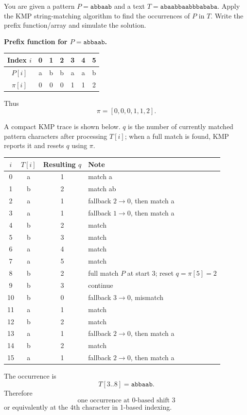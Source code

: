 \documentclass[11pt,a4paper]{article}
\begin{document}
\begin{qaquestion}
You are given a pattern \(P=\texttt{abbaab}\) and a text \(T=\texttt{abaabbaabbbababa}\). Apply the KMP string-matching algorithm to find the occurrences of \(P\) in \(T\). Write the prefix function/array and simulate the solution.
\end{qaquestion}
\begin{qaanswer}[Answer 4(b)]
\textbf{Prefix function for \(P=\texttt{abbaab}\).}

\begin{center}
\begin{tabular}{c|cccccc}
Index \(i\) &0&1&2&3&4&5\\\hline
\(P[i]\)&a&b&b&a&a&b\\
\(\pi[i]\)&0&0&0&1&1&2
\end{tabular}
\end{center}
Thus
\[
\boxed{\pi=[0,0,0,1,1,2]}.
\]

A compact KMP trace is shown below. \(q\) is the number of currently matched pattern characters after processing \(T[i]\); when a full match is found, KMP reports it and resets \(q\) using \(\pi\).

\begin{center}
\small
\begin{tabular}{c c c l}
\toprule
\(i\) & \(T[i]\) & Resulting \(q\) & Note\\
\midrule
0&a&1&match a\\
1&b&2&match ab\\
2&a&1&fallback \(2\to0\), then match a\\
3&a&1&fallback \(1\to0\), then match a\\
4&b&2&match\\
5&b&3&match\\
6&a&4&match\\
7&a&5&match\\
8&b&2&full match \(P\) at start 3; reset \(q=\pi[5]=2\)\\
9&b&3&continue\\
10&b&0&fallback \(3\to0\), mismatch\\
11&a&1&match\\
12&b&2&match\\
13&a&1&fallback \(2\to0\), then match a\\
14&b&2&match\\
15&a&1&fallback \(2\to0\), then match a\\
\bottomrule
\end{tabular}
\end{center}

The occurrence is
\[
T[3..8]=\texttt{abbaab}.
\]
Therefore
\[
\boxed{\text{one occurrence at 0-based shift }3}
\]
or equivalently at the \(\boxed{4\text{th character}}\) in 1-based indexing.
\end{qaanswer}
\end{document}
